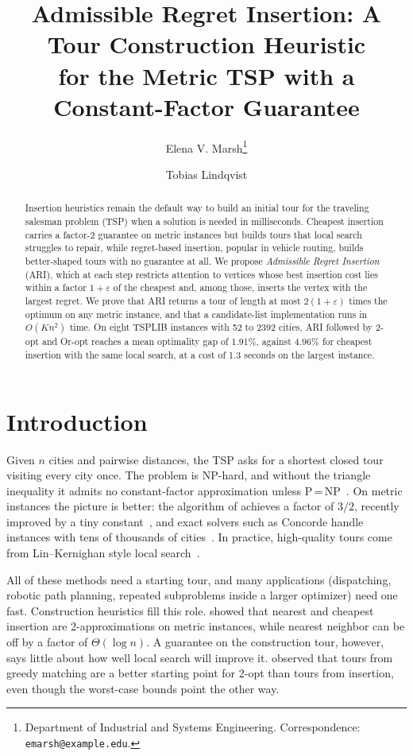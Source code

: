 \documentclass[11pt]{article}
\title{Admissible Regret Insertion: A Tour Construction Heuristic\\for the Metric TSP with a Constant-Factor Guarantee}
\author{Elena V. Marsh\thanks{Department of Industrial and Systems Engineering. Correspondence: \texttt{emarsh@example.edu}.} \and Tobias Lindqvist}
\date{}
\theoremstyle{definition}
\theoremstyle{remark}
\begin{document}
\maketitle

\begin{abstract}
Insertion heuristics remain the default way to build an initial tour for the traveling salesman problem (TSP) when a solution is needed in milliseconds. Cheapest insertion carries a factor-2 guarantee on metric instances but builds tours that local search struggles to repair, while regret-based insertion, popular in vehicle routing, builds better-shaped tours with no guarantee at all. We propose \emph{Admissible Regret Insertion} (ARI), which at each step restricts attention to vertices whose best insertion cost lies within a factor $1+\varepsilon$ of the cheapest and, among those, inserts the vertex with the largest regret. We prove that ARI returns a tour of length at most $2(1+\varepsilon)$ times the optimum on any metric instance, and that a candidate-list implementation runs in $O(Kn^2)$ time. On eight TSPLIB instances with 52 to 2392 cities, ARI followed by 2-opt and Or-opt reaches a mean optimality gap of 1.91\%, against 4.96\% for cheapest insertion with the same local search, at a cost of 1.3 seconds on the largest instance.
\end{abstract}

\section{Introduction}
\label{sec:intro}

Given $n$ cities and pairwise distances, the TSP asks for a shortest closed tour visiting every city once. The problem is NP-hard, and without the triangle inequality it admits no constant-factor approximation unless P\,=\,NP~\cite{sahni1976}. On metric instances the picture is better: the algorithm of \citet{christofides1976} achieves a factor of $3/2$, recently improved by a tiny constant~\cite{karlin2021}, and exact solvers such as Concorde handle instances with tens of thousands of cities~\cite{applegate2006}. In practice, high-quality tours come from Lin--Kernighan style local search~\cite{lin1973,helsgaun2000}.

All of these methods need a starting tour, and many applications (dispatching, robotic path planning, repeated subproblems inside a larger optimizer) need one fast. Construction heuristics fill this role. \citet{rosenkrantz1977} showed that nearest and cheapest insertion are 2-approximations on metric instances, while nearest neighbor can be off by a factor of $\Theta(\log n)$. A guarantee on the construction tour, however, says little about how well local search will improve it. \citet{johnson1997} observed that tours from greedy matching are a better starting point for 2-opt than tours from insertion, even though the worst-case bounds point the other way.
\end{document}
